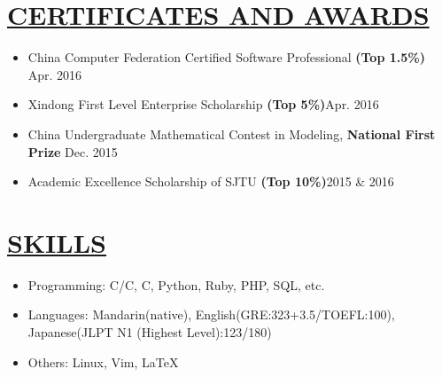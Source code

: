 \documentclass{article}
\newcommand{\CC}{C\nolinebreak\hspace{-.05em}\raisebox{.4ex}{\tiny\bf +}\nolinebreak\hspace{-.10em}\raisebox{.4ex}{\tiny\bf +}}
\newcommand{\CS}{C\nolinebreak\hspace{-.05em}\raisebox{.6ex}{\scriptsize\bf \#}}
\begin{document}
\section{\underline{CERTIFICATES AND AWARDS}}
{\begin{itemize}
\item China Computer Federation Certified Software Professional \textbf{(Top 1.5\%)} \hfill Apr. 2016
\item Xindong First Level Enterprise Scholarship \textbf{(Top 5\%)}\hfill Apr. 2016
\item China Undergraduate Mathematical Contest in Modeling, \textbf{National First Prize} \hfill Dec. 2015
\item Academic Excellence Scholarship of SJTU \textbf{(Top 10\%)}\hfill 2015 \& 2016
\end{itemize}}\vspace{\parsep}

\section{\underline{SKILLS}}
{\begin{itemize}
\item Programming: C/\CC, \CS, Python, Ruby, PHP, SQL, etc.
\item Languages: Mandarin(native), English(GRE:323+3.5/TOEFL:100), Japanese(JLPT N1 (Highest Level):123/180)
\item Others: Linux, Vim, \LaTeX
\end{itemize}}
\end{document}

